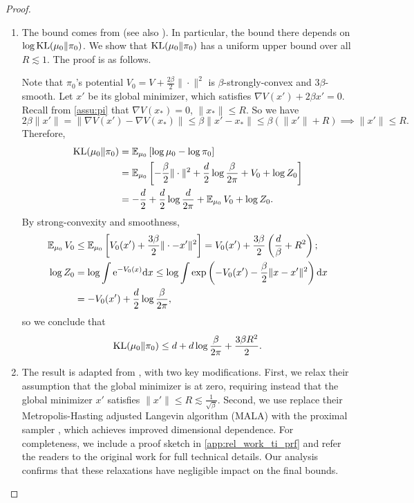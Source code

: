 \begin{proof}
\begin{enumerate}[wide=0pt,itemsep=0pt, topsep=0pt,parsep=0pt,partopsep=0pt]
\item The bound comes from \citet[Theorem 2]{vempala2019rapid} (see also \citet[Theorem 4.2.5]{chewi2022log}). In particular, the bound there depends on $\log\operatorname{KL}(\mu_0\|\pi_0)$. We show that $\operatorname{KL}(\mu_0\|\pi_0)$ has a uniform upper bound over all $R\lesssim1$. The proof is as follows.

Note that $\pi_0$'s potential $V_0=V+\frac{2\beta}{2}\|\cdot\|^2$ is $\beta$-strongly-convex and $3\beta$-smooth. Let $x'$ be its global minimizer, which satisfies $\nabla V(x')+2\beta x'=0$. Recall from \cref{assu:pi} that $\nabla V(x_*)=0$, $\|x_*\|\le R$. So we have
$$2\beta\|x'\|=\|\nabla V(x')-\nabla V(x_*)\|\le\beta\|x'-x_*\|\le\beta(\|x'\|+R)\implies\|x'\|\le R.$$
Therefore,
\begin{align*}
    \operatorname{KL}(\mu_0\|\pi_0)&=\operatorname{\mathbb{E}}_{\mu_0}\left[\log\mu_0-\log\pi_0\right]\\
    &=\operatorname{\mathbb{E}}_{\mu_0}\left[-\frac{\beta}{2}\|\cdot\|^2+\frac{d}{2}\log\frac{\beta}{2\pi}+V_0+\log Z_0\right]\\
    &=-\frac{d}{2}+\frac{d}{2}\log\frac{d}{2\pi}+\operatorname{\mathbb{E}}_{\mu_0}V_0+\log Z_0.
\end{align*}
By strong-convexity and smoothness, 
\begin{align*}
    \operatorname{\mathbb{E}}_{\mu_0}V_0&\le\operatorname{\mathbb{E}}_{\mu_0}\left[V_0(x')+\frac{3\beta}{2}\|\cdot-x'\|^2\right]=V_0(x')+\frac{3\beta}{2}\left(\frac{d}{\beta}+R^2\right);\\
    \log Z_0&=\log\int\mathrm{e}^{-V_0(x)}\mathrm{d} x\le\log\int\exp\left(-V_0(x')-\frac{\beta}{2}\|x-x'\|^2\right)\mathrm{d} x\\
    &=-V_0(x')+\frac{d}{2}\log\frac{\beta}{2\pi},
\end{align*}
so we conclude that
$$\operatorname{KL}(\mu_0\|\pi_0)\le d+d\log\frac{\beta}{2\pi}+\frac{3\beta R^2}{2}.$$

\item The result is adapted from \citet[Section 3]{ge2020estimating}, with two key modifications. First, we relax their assumption that the global minimizer is at zero, requiring instead that the global minimizer $x'$ satisfies $\|x'\|\le R\lesssim\frac{1}{\sqrt{\beta}}$. Second, we use replace their Metropolis-Hasting adjusted Langevin algorithm (MALA) with the proximal sampler \citep{fan2023improved}, which achieves improved dimensional dependence. For completeness, we include a proof sketch in \cref{app:rel_work_ti_prf} and refer the readers to the original work for full technical details. Our analysis confirms that these relaxations have negligible impact on the final bounds.
\end{enumerate}
\end{proof}

